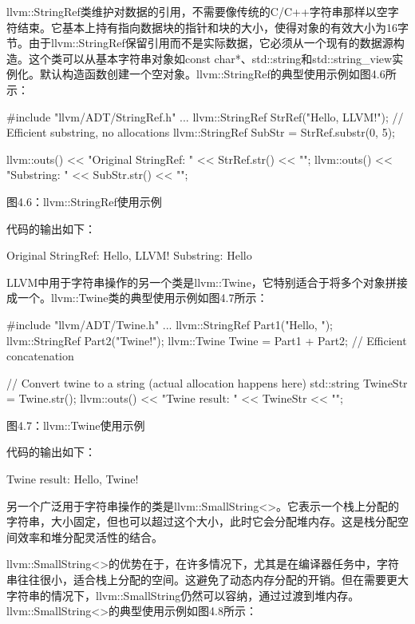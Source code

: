 llvm::StringRef类维护对数据的引用，不需要像传统的C/C++字符串那样以空字符结束。它基本上持有指向数据块的指针和块的大小，使得对象的有效大小为16字节。由于llvm::StringRef保留引用而不是实际数据，它必须从一个现有的数据源构造。这个类可以从基本字符串对象如const char*、std::string和std::string\_view实例化。默认构造函数创建一个空对象。llvm::StringRef的典型使用示例如图4.6所示：

\begin{cpp}
#include "llvm/ADT/StringRef.h"
...
llvm::StringRef StrRef("Hello, LLVM!");
// Efficient substring, no allocations
llvm::StringRef SubStr = StrRef.substr(0, 5);

llvm::outs() << "Original StringRef: " << StrRef.str() << "\n";
llvm::outs() << "Substring: " << SubStr.str() << "\n";
\end{cpp}

\begin{center}
图4.6：llvm::StringRef使用示例
\end{center}

代码的输出如下：

\begin{shell}
Original StringRef: Hello, LLVM!
Substring: Hello
\end{shell}

LLVM中用于字符串操作的另一个类是llvm::Twine，它特别适合于将多个对象拼接成一个。llvm::Twine类的典型使用示例如图4.7所示：

\begin{cpp}
#include "llvm/ADT/Twine.h"
...
llvm::StringRef Part1("Hello, ");
llvm::StringRef Part2("Twine!");
llvm::Twine Twine = Part1 + Part2;  // Efficient concatenation

// Convert twine to a string (actual allocation happens here)
std::string TwineStr = Twine.str();
llvm::outs() << "Twine result: " << TwineStr << "\n";
\end{cpp}

\begin{center}
图4.7：llvm::Twine使用示例
\end{center}

代码的输出如下：

\begin{shell}
Twine result: Hello, Twine!
\end{shell}

另一个广泛用于字符串操作的类是llvm::SmallString<>。它表示一个栈上分配的字符串，大小固定，但也可以超过这个大小，此时它会分配堆内存。这是栈分配空间效率和堆分配灵活性的结合。

llvm::SmallString<>的优势在于，在许多情况下，尤其是在编译器任务中，字符串往往很小，适合栈上分配的空间。这避免了动态内存分配的开销。但在需要更大字符串的情况下，llvm::SmallString仍然可以容纳，通过过渡到堆内存。llvm::SmallString<>的典型使用示例如图4.8所示：

